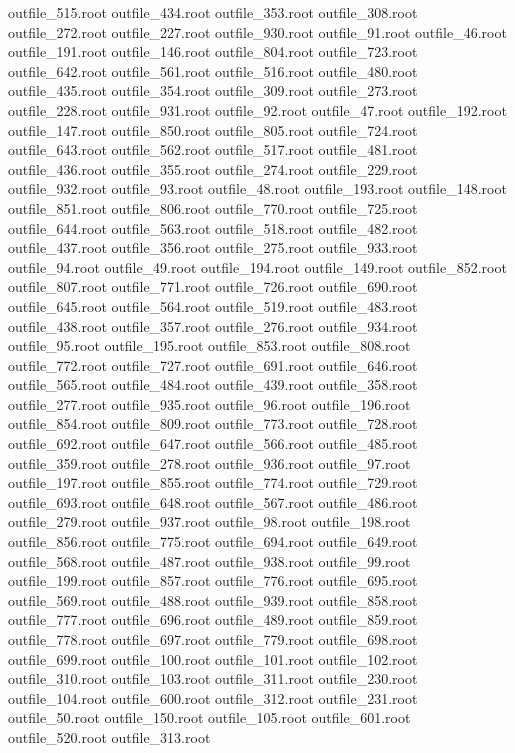 outfile_515.root
outfile_434.root
outfile_353.root
outfile_308.root
outfile_272.root
outfile_227.root
outfile_930.root
outfile_91.root
outfile_46.root
outfile_191.root
outfile_146.root
outfile_804.root
outfile_723.root
outfile_642.root
outfile_561.root
outfile_516.root
outfile_480.root
outfile_435.root
outfile_354.root
outfile_309.root
outfile_273.root
outfile_228.root
outfile_931.root
outfile_92.root
outfile_47.root
outfile_192.root
outfile_147.root
outfile_850.root
outfile_805.root
outfile_724.root
outfile_643.root
outfile_562.root
outfile_517.root
outfile_481.root
outfile_436.root
outfile_355.root
outfile_274.root
outfile_229.root
outfile_932.root
outfile_93.root
outfile_48.root
outfile_193.root
outfile_148.root
outfile_851.root
outfile_806.root
outfile_770.root
outfile_725.root
outfile_644.root
outfile_563.root
outfile_518.root
outfile_482.root
outfile_437.root
outfile_356.root
outfile_275.root
outfile_933.root
outfile_94.root
outfile_49.root
outfile_194.root
outfile_149.root
outfile_852.root
outfile_807.root
outfile_771.root
outfile_726.root
outfile_690.root
outfile_645.root
outfile_564.root
outfile_519.root
outfile_483.root
outfile_438.root
outfile_357.root
outfile_276.root
outfile_934.root
outfile_95.root
outfile_195.root
outfile_853.root
outfile_808.root
outfile_772.root
outfile_727.root
outfile_691.root
outfile_646.root
outfile_565.root
outfile_484.root
outfile_439.root
outfile_358.root
outfile_277.root
outfile_935.root
outfile_96.root
outfile_196.root
outfile_854.root
outfile_809.root
outfile_773.root
outfile_728.root
outfile_692.root
outfile_647.root
outfile_566.root
outfile_485.root
outfile_359.root
outfile_278.root
outfile_936.root
outfile_97.root
outfile_197.root
outfile_855.root
outfile_774.root
outfile_729.root
outfile_693.root
outfile_648.root
outfile_567.root
outfile_486.root
outfile_279.root
outfile_937.root
outfile_98.root
outfile_198.root
outfile_856.root
outfile_775.root
outfile_694.root
outfile_649.root
outfile_568.root
outfile_487.root
outfile_938.root
outfile_99.root
outfile_199.root
outfile_857.root
outfile_776.root
outfile_695.root
outfile_569.root
outfile_488.root
outfile_939.root
outfile_858.root
outfile_777.root
outfile_696.root
outfile_489.root
outfile_859.root
outfile_778.root
outfile_697.root
outfile_779.root
outfile_698.root
outfile_699.root
outfile_100.root
outfile_101.root
outfile_102.root
outfile_310.root
outfile_103.root
outfile_311.root
outfile_230.root
outfile_104.root
outfile_600.root
outfile_312.root
outfile_231.root
outfile_50.root
outfile_150.root
outfile_105.root
outfile_601.root
outfile_520.root
outfile_313.root
